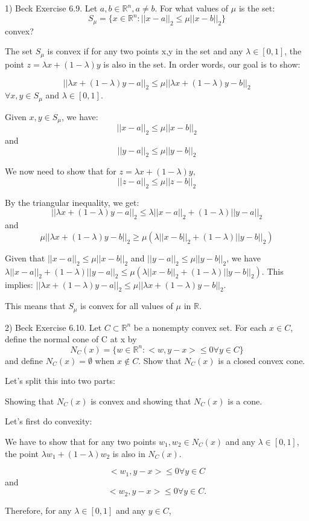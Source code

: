 \documentclass{article}
\newcommand{\RR}{\mathbb{R}}
\begin{document}
1) Beck Exercise 6.9. Let $a,b \in \RR^n, a \neq b.$ For what values of $\mu$ is the set:
\[S_{\mu} = \{x \in \RR^n : ||x-a||_2 \leq \mu ||x-b||_2\}\]
convex?

The set $S_{\mu}$ is convex if for any two points x,y in the set
and any $\lambda \in [0, 1]$, the point
$z = \lambda x + (1 - \lambda) y$ is also in the set.
In order words, our goal is to show:

\[||\lambda x + (1 - \lambda) y - a||_2 \leq \mu ||\lambda x + (1 - \lambda) y - b||_2\]
$\forall x, y \in S_{\mu}$ and $\lambda \in [0, 1]$.

Given $x, y \in S_{\mu}$, we have:
\[||x-a||_2 \leq \mu ||x-b||_2\]
and
\[||y-a||_2 \leq \mu ||y-b||_2\]

We now need to show that for $z = \lambda x + (1 - \lambda) y$,
\[||z-a||_2 \leq \mu ||z-b||_2\]

By the triangular inequality, we get:
\[||\lambda x + (1 - \lambda) y - a||_2 \leq \lambda ||x-a||_2 + (1 - \lambda)||y - a||_2\]
and
\[\mu ||\lambda x + (1 - \lambda) y - b||_2 \geq \mu (\lambda ||x-b||_2 + (1 - \lambda)||y - b||_2)\]

Given that $||x-a||_2 \leq \mu ||x-b||_2$ and $||y-a||_2 \leq \mu ||y-b||_2$,
we have $\lambda ||x-a||_2 + (1 - \lambda) ||y - a||_2 \leq \mu (\lambda ||x-b||_2 + (1 - \lambda)||y - b||_2)$.
This implies:
$||\lambda x + (1 - \lambda) y - a||_2 \leq \mu ||\lambda x + (1 - \lambda) y - b||_2$.

This means that $S_{\mu}$ is convex for all values of $\mu$ in $\RR$.


2) Beck Exercise 6.10. Let $C \subset \RR^n$ be a nonempty convex set. For each $x \in C$, define the normal cone of C at x by
\[N_{C}(x) = \{w \in \RR^n : <w, y-x> \leq 0 \forall y \in C\}\]
and define $N_{C}(x) = \emptyset$ when $x \not \in C$. Show that $N_{C}(x)$ is a closed convex cone.

Let's split this into two parts:

Showing that $N_{C}(x)$ is convex
and showing that $N_{C}(x)$ is a cone.

Let's first do convexity:

We have to show that for any two points $w_1, w_2 \in N_{C}(x)$
and any $\lambda \in [0, 1]$,
the point $\lambda w_1 + (1 - \lambda) w_2$ is also in $N_{C}(x)$.

\[<w_1, y-x> \leq 0 \forall y \in C\]
and
\[<w_2, y-x> \leq 0 \forall y \in C.\]

Therefore, for any $\lambda \in [0, 1]$ and any $y \in C$,
\end{document}
